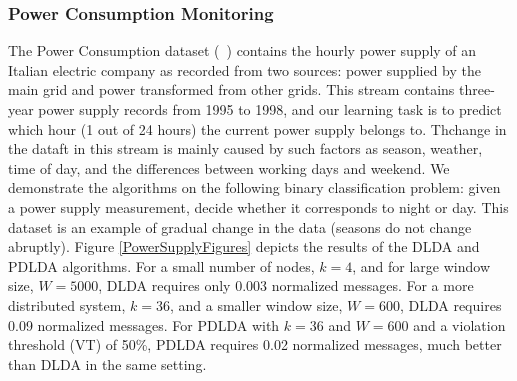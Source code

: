 \documentclass{vldb}
\begin{document}
\subsubsection{Power Consumption Monitoring}
The Power Consumption dataset  (~\citealt{powerSupply}) contains the hourly power supply of an
Italian electric company as recorded from two sources: power supplied
by the main grid and power transformed from other grids.
This stream contains three-year power supply records
from 1995 to 1998, and our learning task is to predict which hour (1 out of 24 hours) 
the current power supply belongs to. 
Thchange in the dataft in this stream is mainly caused by such factors as season, weather, time of day,
and the differences between working days and weekend.
We demonstrate the algorithms on the following binary classification problem:
given a power supply measurement, decide whether it corresponds to night or day.
This dataset is an example of gradual change in the data (seasons do not
change abruptly).
Figure \ref{PowerSupplyFigures} depicts the results of the DLDA
and PDLDA algorithms. For a small number of nodes, $k=4$, and for large
window size, $W=5000$, DLDA requires only 0.003 normalized messages.
For a more distributed system, $k=36$, and a smaller window
size, $W=600$, DLDA requires 0.09 normalized messages. For PDLDA with
$k=36$ and $W=600$ and a violation threshold (VT) of 50\%, PDLDA
requires 0.02 normalized messages, much better than DLDA in the same setting.
\end{document}
